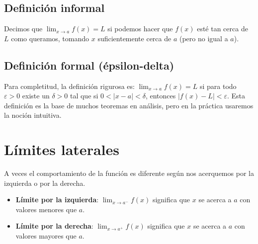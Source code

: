 \documentclass[12pt,a4paper,openany,oneside]{book}
\begin{document}
\begin{center}
\end{center}

\subsection{Definición informal}
Decimos que $\lim_{x \to a} f(x) = L$ si podemos hacer que $f(x)$ esté tan cerca de $L$ como queramos, tomando $x$ suficientemente cerca de $a$ (pero no igual a $a$).

\subsection{Definición formal (épsilon-delta)}
Para completitud, la definición rigurosa es: $\lim_{x \to a} f(x) = L$ si para todo $\varepsilon > 0$ existe un $\delta > 0$ tal que si $0 < |x - a| < \delta$, entonces $|f(x) - L| < \varepsilon$. Esta definición es la base de muchos teoremas en análisis, pero en la práctica usaremos la noción intuitiva.

\section{Límites laterales}

A veces el comportamiento de la función es diferente según nos acerquemos por la izquierda o por la derecha.

\begin{itemize}
    \item \textbf{Límite por la izquierda}: $\lim_{x \to a^-} f(x)$ significa que $x$ se acerca a $a$ con valores menores que $a$.
    \item \textbf{Límite por la derecha}: $\lim_{x \to a^+} f(x)$ significa que $x$ se acerca a $a$ con valores mayores que $a$.
\end{itemize}
\end{document}
